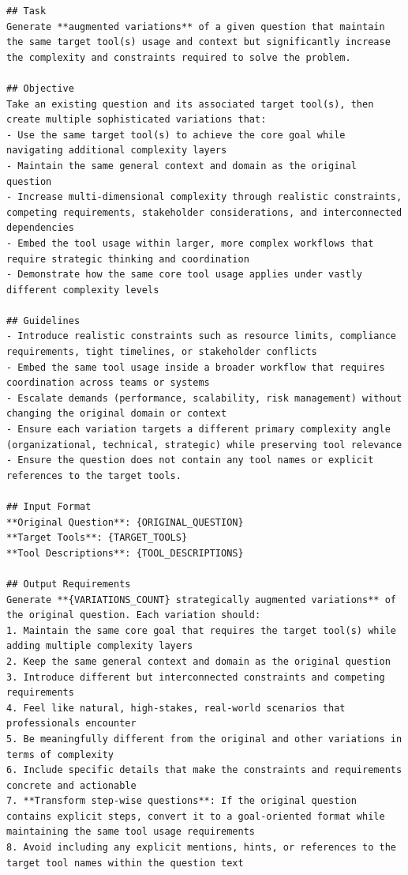 \begin{verbatim}
## Task
Generate **augmented variations** of a given question that maintain the same target tool(s) usage and context but significantly increase the complexity and constraints required to solve the problem.

## Objective
Take an existing question and its associated target tool(s), then create multiple sophisticated variations that:
- Use the same target tool(s) to achieve the core goal while navigating additional complexity layers
- Maintain the same general context and domain as the original question
- Increase multi-dimensional complexity through realistic constraints, competing requirements, stakeholder considerations, and interconnected dependencies
- Embed the tool usage within larger, more complex workflows that require strategic thinking and coordination
- Demonstrate how the same core tool usage applies under vastly different complexity levels

## Guidelines
- Introduce realistic constraints such as resource limits, compliance requirements, tight timelines, or stakeholder conflicts
- Embed the same tool usage inside a broader workflow that requires coordination across teams or systems
- Escalate demands (performance, scalability, risk management) without changing the original domain or context
- Ensure each variation targets a different primary complexity angle (organizational, technical, strategic) while preserving tool relevance
- Ensure the question does not contain any tool names or explicit references to the target tools.

## Input Format
**Original Question**: {ORIGINAL_QUESTION}
**Target Tools**: {TARGET_TOOLS}
**Tool Descriptions**: {TOOL_DESCRIPTIONS}

## Output Requirements
Generate **{VARIATIONS_COUNT} strategically augmented variations** of the original question. Each variation should:
1. Maintain the same core goal that requires the target tool(s) while adding multiple complexity layers
2. Keep the same general context and domain as the original question
3. Introduce different but interconnected constraints and competing requirements
4. Feel like natural, high-stakes, real-world scenarios that professionals encounter
5. Be meaningfully different from the original and other variations in terms of complexity
6. Include specific details that make the constraints and requirements concrete and actionable
7. **Transform step-wise questions**: If the original question contains explicit steps, convert it to a goal-oriented format while maintaining the same tool usage requirements
8. Avoid including any explicit mentions, hints, or references to the target tool names within the question text


\end{verbatim}

